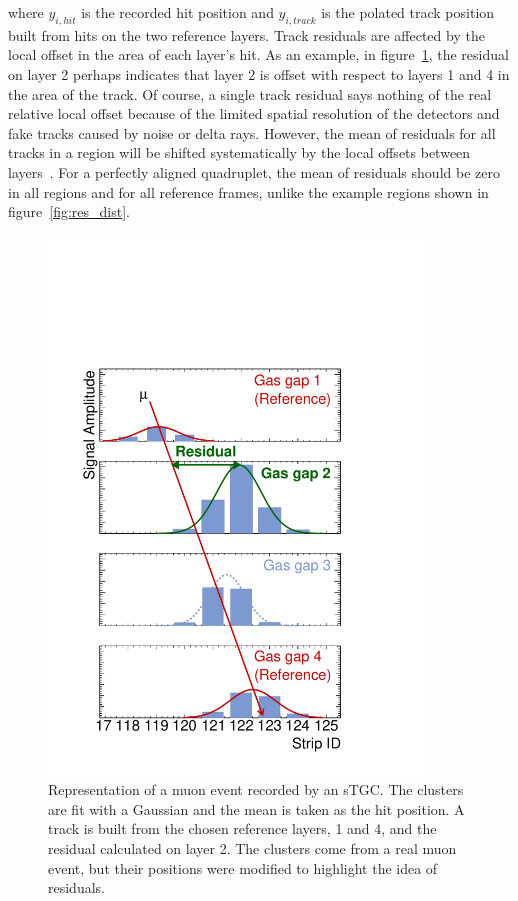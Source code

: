 where $y_{i,hit}$ is the recorded hit position and $y_{i,track}$ is the polated track position built from hits on the two reference layers. Track residuals are affected by the local offset in the area of each layer's hit. As an example, in figure~\ref{fig:fake_event_display}, the residual on layer 2 perhaps indicates that layer 2 is offset with respect to layers 1 and 4 in the area of the track. Of course, a single track residual says nothing of the real relative local offset because of the limited spatial resolution of the detectors and fake tracks caused by noise or delta rays. However, the mean of residuals for all tracks in a region will be shifted systematically by the local offsets between layers~\cite{lefebvre_thesis}. For a perfectly aligned quadruplet, the mean of residuals should be zero in all regions and for all reference frames, unlike the example regions shown in figure~\ref{fig:res_dist}.
\begin{figure}
    \centering
    \includegraphics[width = 0.9\textwidth]{figures/figure_fake_event_display.pdf}
    \caption{Representation of a muon event recorded by an sTGC. The clusters are fit with a Gaussian and the mean is taken as the hit position. A track is built from the chosen reference layers, 1 and 4, and the residual calculated on layer 2. The clusters come from a real muon event, but their positions were modified to highlight the idea of residuals.}
    \label{fig:fake_event_display}
\end{figure}

